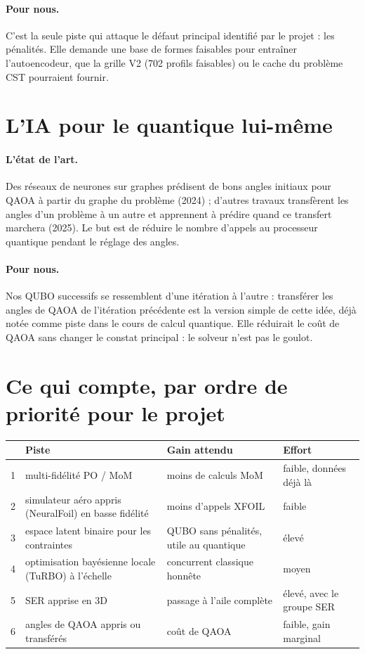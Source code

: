 \paragraph{Pour nous.} C'est la seule piste qui attaque le défaut principal identifié par le projet : les pénalités. Elle demande une base de formes faisables pour entraîner l'autoencodeur, que la grille V2 (702 profils faisables) ou le cache du problème CST pourraient fournir.

\section{L'IA pour le quantique lui-même}
\paragraph{L'état de l'art.} Des réseaux de neurones sur graphes prédisent de bons angles initiaux pour QAOA à partir du graphe du problème (2024) ; d'autres travaux transfèrent les angles d'un problème à un autre et apprennent à prédire quand ce transfert marchera (2025). Le but est de réduire le nombre d'appels au processeur quantique pendant le réglage des angles.
\paragraph{Pour nous.} Nos QUBO successifs se ressemblent d'une itération à l'autre : transférer les angles de QAOA de l'itération précédente est la version simple de cette idée, déjà notée comme piste dans le cours de calcul quantique. Elle réduirait le coût de QAOA sans changer le constat principal : le solveur n'est pas le goulot.

\section{Ce qui compte, par ordre de priorité pour le projet}
\begin{center}
\renewcommand{\arraystretch}{1.25}
\small
\begin{tabularx}{\linewidth}{c>{\raggedright\arraybackslash}X>{\raggedright\arraybackslash}p{3.3cm}>{\raggedright\arraybackslash}p{2.6cm}}
\toprule
& Piste & Gain attendu & Effort \\
\midrule
1 & multi-fidélité PO / MoM & moins de calculs MoM & faible, données déjà là \\
2 & simulateur aéro appris (NeuralFoil) en basse fidélité & moins d'appels XFOIL & faible \\
3 & espace latent binaire pour les contraintes & QUBO sans pénalités, utile au quantique & élevé \\
4 & optimisation bayésienne locale (TuRBO) à l'échelle & concurrent classique honnête & moyen \\
5 & SER apprise en 3D & passage à l'aile complète & élevé, avec le groupe SER \\
6 & angles de QAOA appris ou transférés & coût de QAOA & faible, gain marginal \\
\bottomrule
\end{tabularx}
\end{center}

